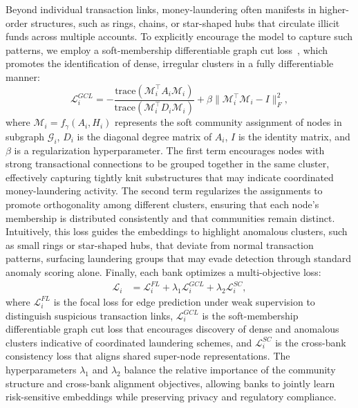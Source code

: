 Beyond individual transaction links, money-laundering often manifests in higher-order structures, such as rings, chains, or star-shaped hubs that circulate illicit funds across multiple accounts. To explicitly encourage the model to capture such patterns, we employ a soft-membership differentiable graph cut loss~\parencite{nazi2019gap}, which promotes the identification of dense, irregular clusters in a fully differentiable manner:
\begin{equation}
\mathcal{L}_i^{GCL} = -\frac{\mathrm{trace}(\mathcal{M}_i^\top A_i \mathcal{M}_i)}{\mathrm{trace}(\mathcal{M}_i^\top D_i \mathcal{M}_i)} + \beta \|\mathcal{M}_i^\top \mathcal{M}_i - I\|_F^2,
\end{equation}
where $\mathcal{M}_i = f_\gamma(A_i, H_i)$ represents the soft community assignment of nodes in subgraph $\mathcal{G}_i$, $D_i$ is the diagonal degree matrix of $A_i$, $I$ is the identity matrix, and $\beta$ is a regularization hyperparameter. The first term encourages nodes with strong transactional connections to be grouped together in the same cluster, effectively capturing tightly knit substructures that may indicate coordinated money-laundering activity. The second term regularizes the assignments to promote orthogonality among different clusters, ensuring that each node’s membership is distributed consistently and that communities remain distinct. Intuitively, this loss guides the embeddings to highlight anomalous clusters, such as small rings or star-shaped hubs, that deviate from normal transaction patterns, surfacing laundering groups that may evade detection through standard anomaly scoring alone. Finally, each bank optimizes a multi-objective loss: 
\begin{align}
\label{overall_loss}
    \mathcal{L}_i &= \mathcal{L}_i^{FL} + \lambda_1 \mathcal{L}_i^{GCL} + \lambda_2 \mathcal{L}_i^{SC},
\end{align}
where $\mathcal{L}_i^{FL}$ is the focal loss for edge prediction under weak supervision to distinguish suspicious transaction links, $\mathcal{L}_i^{GCL}$ is the soft-membership differentiable graph cut loss that encourages discovery of dense and anomalous clusters indicative of coordinated laundering schemes, and $\mathcal{L}_i^{SC}$ is the cross-bank consistency loss that aligns shared super-node representations. The hyperparameters $\lambda_1$ and $\lambda_2$ balance the relative importance of the community structure and cross-bank alignment objectives, allowing banks to jointly learn risk-sensitive embeddings while preserving privacy and regulatory compliance.

